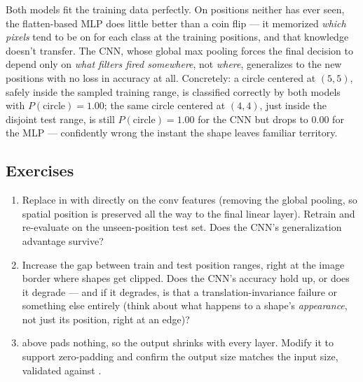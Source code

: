 Both models fit the training data perfectly. On positions neither has ever seen, the flatten-based MLP does little better than a coin flip --- it memorized \emph{which pixels} tend to be on for each class at the training positions, and that knowledge doesn't transfer. The CNN, whose global max pooling forces the final decision to depend only on \emph{what filters fired somewhere}, not \emph{where}, generalizes to the new positions with no loss in accuracy at all. Concretely: a circle centered at $(5,5)$, safely inside the sampled training range, is classified correctly by both models with $P(\text{circle})=1.00$; the same circle centered at $(4,4)$, just inside the disjoint test range, is still $P(\text{circle})=1.00$ for the CNN but drops to $0.00$ for the MLP --- confidently wrong the instant the shape leaves familiar territory.

\subsection*{Exercises}
\begin{enumerate}
  \item Replace  in  with  directly on the conv features (removing the global pooling, so spatial position is preserved all the way to the final linear layer). Retrain and re-evaluate on the unseen-position test set. Does the CNN's generalization advantage survive?
  \item Increase the gap between train and test position ranges, right at the image border where shapes get clipped. Does the CNN's accuracy hold up, or does it degrade --- and if it degrades, is that a translation-invariance failure or something else entirely (think about what happens to a shape's \emph{appearance}, not just its position, right at an edge)?
  \item {} above pads nothing, so the output shrinks with every layer. Modify it to support zero-padding and confirm the output size matches the input size, validated against .
\end{enumerate}

\vfill
{}
